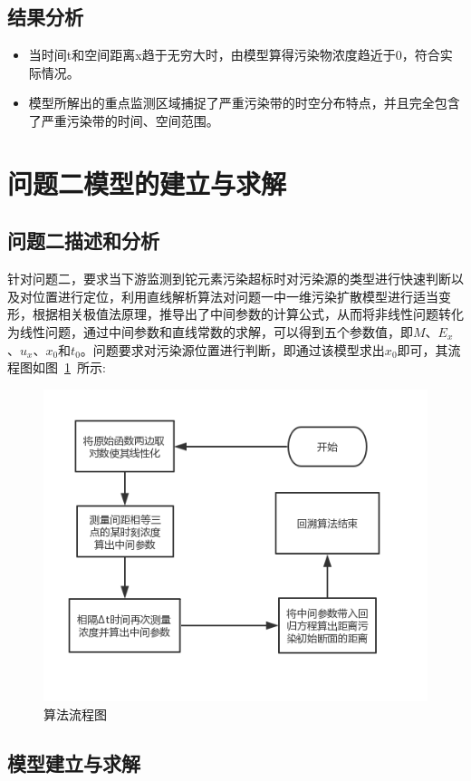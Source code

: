 \documentclass{whutmod}
\begin{document}
	
	\subsection{结果分析}
	\begin{itemize}
		\item [(1)] 当时间t和空间距离x趋于无穷大时，由模型算得污染物浓度趋近于0，符合实际情况。
		\item [(2)] 
	模型所解出的重点监测区域捕捉了严重污染带的时空分布特点，并且完全包含了严重污染带的时间、空间范围。

	\end{itemize}

	\section{问题二模型的建立与求解}
	\subsection{问题二描述和分析}
	针对问题二，要求当下游监测到铊元素污染超标时对污染源的类型进行快速判断以及对位置进行定位，利用直线解析算法对问题一中一维污染扩散模型进行适当变形，根据相关极值法原理，推导出了中间参数的计算公式，从而将非线性问题转化为线性问题，通过中间参数和直线常数的求解，可以得到五个参数值，即$M$、$E_{x}$、$u_{x}$、$x_{0}$和$t_{0}$。问题要求对污染源位置进行判断，即通过该模型求出$x_{0}$即可，其流程图如图~\ref{lct}~所示:
			\begin{figure}[H]
	\centering
	\includegraphics[width=.8\textwidth]{figures/lct.png}
	\caption{算法流程图}\label{lct}
	\end{figure}
	\subsection{模型建立与求解}
\end{document}
